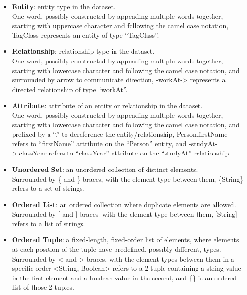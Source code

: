 \begin{itemize}
    \item \textbf{Entity}: entity type in the dataset.\\
        One word, possibly constructed by appending multiple words together, starting with uppercase character and following the camel case notation,
        \eg \textsf{TagClass} represents an entity of type ``TagClass''.
    \item \textbf{Relationship}: relationship type in the dataset.\\
        One word, possibly constructed by appending multiple words together, starting with lowercase character and following the camel case notation,
        and surrounded by arrow to communicate direction,
        \eg \mbox{\textsf{-workAt->}} represents a directed relationship of type ``workAt''.
    \item \textbf{Attribute}: attribute of an entity or relationship in the dataset.\\
        One word, possibly constructed by appending multiple words together, starting with lowercase character and following the camel case notation,
        and prefixed by a ``.'' to dereference the entity/relationship,
        \eg \textsf{Person.firstName} refers to ``firstName'' attribute on the ``Person'' entity,
        and \mbox{\textsf{-studyAt->.classYear}} refers to ``classYear'' attribute on the ``studyAt'' relationship.
    \item \textbf{Unordered Set}: an unordered collection of distinct elements.\\
        Surrounded by \{ and \} braces, with the element type between them,
        \eg \textsf{\{String\}} refers to a set of strings.
    \item \textbf{Ordered List}: an ordered collection where duplicate elements are allowed.\\
        Surrounded by [ and ] braces, with the element type between them,
        \eg \textsf{[String]} refers to a list of strings.
    \item \textbf{Ordered Tuple}: a fixed-length, fixed-order list of elements, where elements at each position of the tuple have predefined, possibly different, types. \\
        Surrounded by < and > braces, with the element types between them in a specific order
        \eg \textsf{<String, Boolean>} refers to a 2-tuple containing a string value in the first element and a boolean value in the second,
        and \textsf{\{<String, Boolean>\}} is an ordered list of those 2-tuples.
\end{itemize}

